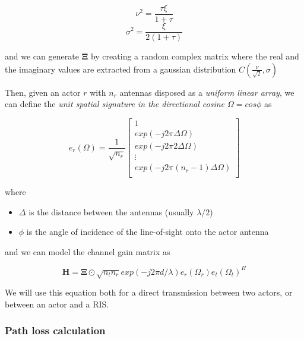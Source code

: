 \begin{equation}
  \nu^2 = \frac{\tau \xi}{1 + \tau}
\end{equation}
\begin{equation}
  \sigma^2 = \frac{\xi}{2(1 + \tau)}
\end{equation}

and we can generate $\bm{\Xi}$ by creating a random complex matrix where the real and the imaginary values are extracted from a gaussian distribution $C(\frac{\nu}{\sqrt{2}}, \sigma)$ \cite{Rice_distribution}

Then, given an actor $r$ with $n_r$ antennas disposed as a \textit{uniform linear array}, we can define the \textit{unit spatial signature in the directional cosine $\Omega = cos \phi$} \cite{Fundamentals_Wireless_Communication_chapter7} as

\begin{equation}
  e_r(\Omega) = \frac{1}{\sqrt{n_r}}
  \begin{bmatrix}
    1                                \\
    exp(-j2\pi\Delta\Omega)          \\
    exp(-j2\pi2\Delta\Omega)         \\
    \vdots                           \\
    exp(-j2\pi(n_r - 1)\Delta\Omega) \\
  \end{bmatrix}
\end{equation}

where
\begin{itemize}
  \item $\Delta$ is the distance between the antennas (usually $\lambda / 2$)
  \item $\phi$ is the angle of incidence of the line-of-sight onto the actor antenna
\end{itemize}

and we can model the channel gain matrix \cite{Fundamentals_Wireless_Communication_chapter7} as

\begin{equation}
  \bm{H} = \bm{\Xi} \odot \sqrt{n_t n_r} exp(-j2 \pi d / \lambda) e_r(\Omega_r) e_t(\Omega_t)^H
\end{equation}

We will use this equation both for a direct transmission between two actors, or between an actor and a RIS.

\subsubsection{Path loss calculation}

